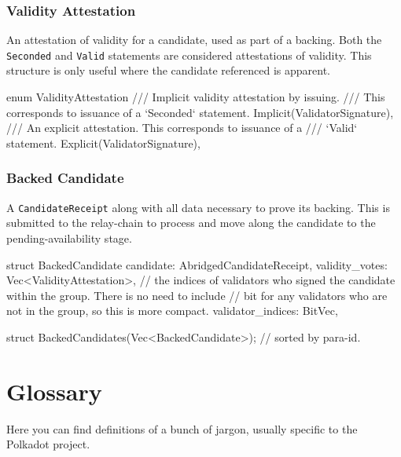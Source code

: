 \subsubsection{Validity Attestation}

An attestation of validity for a candidate, used as part of a backing. Both the
\verb|Seconded| and \verb|Valid| statements are considered attestations of
validity. This structure is only useful where the candidate referenced is
apparent.

\begin{verbnobox}[\small]
enum ValidityAttestation {
  /// Implicit validity attestation by issuing.
  /// This corresponds to issuance of a `Seconded` statement.
  Implicit(ValidatorSignature),
  /// An explicit attestation. This corresponds to issuance of a
  /// `Valid` statement.
  Explicit(ValidatorSignature),
}
\end{verbnobox}

\subsubsection{Backed Candidate}

A \verb|CandidateReceipt| along with all data necessary to prove its backing.
This is submitted to the relay-chain to process and move along the candidate to
the pending-availability stage.

\begin{verbnobox}[\small]
struct BackedCandidate {
  candidate: AbridgedCandidateReceipt,
  validity_votes: Vec<ValidityAttestation>,
  // the indices of validators who signed the candidate within the group. There is no need to include
  // bit for any validators who are not in the group, so this is more compact.
  validator_indices: BitVec,
}

struct BackedCandidates(Vec<BackedCandidate>); // sorted by para-id.
\end{verbnobox}

\section{Glossary}

Here you can find definitions of a bunch of jargon, usually specific to the
Polkadot project.


